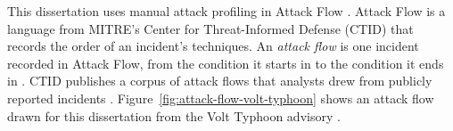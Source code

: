 \documentclass{cshonours}
\begin{document}
This dissertation uses manual attack profiling in Attack Flow
\citep{ctid2025attackflow}. Attack Flow is a
language from MITRE's Center for Threat-Informed Defense (CTID) that
records the order of an incident's techniques.
An \emph{attack flow} is one incident recorded in Attack Flow, from the condition
it starts in to the condition it ends in \citep{ctid2025attackflow}. CTID
publishes a corpus of attack flows that analysts drew from publicly reported
incidents \citep{ctid2025attackflow}. Figure~\ref{fig:attack-flow-volt-typhoon}
shows an attack flow drawn for this dissertation from the Volt Typhoon advisory
\citep{cisaaa24038a}.
\end{document}
